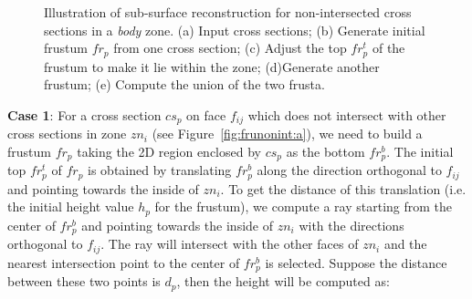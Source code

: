 \begin{figure} [htbp]
{\begin{minipage}[b]{0.3\textwidth}
    \end{minipage}}
  \caption{Illustration of sub-surface reconstruction for non-intersected cross sections in a \textit{body} zone.
  (a) Input cross sections;
  (b) Generate initial frustum $fr_p$ from one cross section;
  (c) Adjust the top $fr_p^t$ of the frustum to make it lie within the zone;
  (d)Generate another frustum;
  (e) Compute the union of the two frusta.}
  \label{fig:frunonint}
\end{figure}

\textbf{Case 1}: For a cross section $cs_p$ on face $f_{ij}$ which
does not intersect with other cross sections in zone $zn_i$ (see
Figure~\ref{fig:frunonint:a}), we need to build a frustum $fr_p$
taking the 2D region enclosed by $cs_p$ as the bottom $fr_p^b$. The
initial top $fr_p^t$ of $fr_p$ is obtained by translating $fr_p^b$
along the direction orthogonal to $f_{ij}$ and pointing towards the
inside of $zn_i$. To get the distance of this translation (i.e. the
initial height value $h_p$ for the frustum), we compute a ray
starting from the center of $fr_p^b$ and pointing towards the inside
of $zn_i$ with the directions orthogonal to $f_{ij}$. The ray will
intersect with the other faces of $zn_i$ and the nearest
intersection point to the center of $fr_p^b$ is selected. Suppose
the distance between these two points is $d_p$, then the height will
be computed as:

